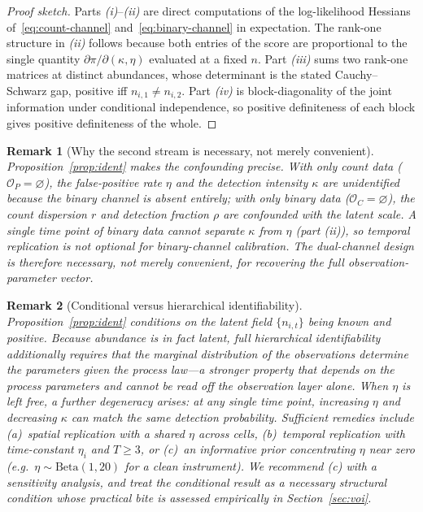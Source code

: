 \documentclass[preprint,12pt]{elsarticle}
\newtheorem{remark}{Remark}
\theoremstyle{definition}
\newcommand{\OC}{\mathcal{O}_C}
\newcommand{\OP}{\mathcal{O}_P}
\begin{document}
\begin{proof}[Proof sketch]
Parts \emph{(i)}--\emph{(ii)} are direct computations of the log-likelihood
Hessians of~\eqref{eq:count-channel} and~\eqref{eq:binary-channel} in
expectation. The rank-one structure in \emph{(ii)} follows because both
entries of the score are proportional to the single quantity
$\partial\pi/\partial(\kappa,\eta)$ evaluated at a fixed $n$. Part
\emph{(iii)} sums two rank-one matrices at distinct abundances, whose
determinant is the stated Cauchy--Schwarz gap, positive iff
$n_{i,1}\ne n_{i,2}$. Part \emph{(iv)} is block-diagonality of the joint
information under conditional independence, so positive definiteness of each
block gives positive definiteness of the whole.
\end{proof}

\begin{remark}[Why the second stream is necessary, not merely convenient]
\label{rmk:necessary}
Proposition~\ref{prop:ident} makes the confounding precise. With only count
data ($\OP=\varnothing$), the false-positive rate $\eta$ and the detection
intensity $\kappa$ are unidentified because the binary channel is absent
entirely; with only binary data ($\OC=\varnothing$), the count dispersion
$r$ and detection fraction $\rho$ are confounded with the latent scale. A
\emph{single} time point of binary data cannot separate $\kappa$ from
$\eta$ (part \emph{(ii)}), so temporal replication is not optional for
binary-channel calibration. The dual-channel design is therefore necessary,
not merely convenient, for recovering the full observation-parameter
vector.
\end{remark}

\begin{remark}[Conditional versus hierarchical identifiability]
\label{rmk:conditional}
Proposition~\ref{prop:ident} conditions on the latent field
$\{n_{i,t}\}$ being known and positive. Because abundance is in fact latent,
full hierarchical identifiability additionally requires that the marginal
distribution of the observations determine the parameters given the process
law---a stronger property that depends on the process parameters and cannot
be read off the observation layer alone. When $\eta$ is left free, a further
degeneracy arises: at any single time point, increasing $\eta$ and
decreasing $\kappa$ can match the same detection probability. Sufficient
remedies include (a)~spatial replication with a shared $\eta$ across cells,
(b)~temporal replication with time-constant $\eta_i$ and $T\ge3$, or (c)~an
informative prior concentrating $\eta$ near zero (e.g.\
$\eta\sim\mathrm{Beta}(1,20)$ for a clean instrument). We recommend (c) with
a sensitivity analysis, and treat the conditional result as a necessary
structural condition whose practical bite is assessed empirically in
Section~\ref{sec:voi}.
\end{remark}
\end{document}
